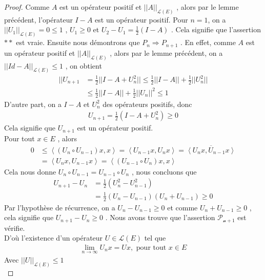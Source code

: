 \documentclass{report}
\begin{document}
{\begin{proof}
Comme $A$ est un opérateur positif et $||A||_{\mathscr{L}(E)}$ , alors par le lemme précédent, l'opérateur $I - A$ est un opérateur positif. Pour $n = 1$, on a $||U_1||_{\mathscr{L}(E)} = 0 \le 1$ , $U_1 \ge 0$ et $U_2 - U_1 = \frac{1}{2} (I - A)$ . Cela signifie que l'assertion $**$ est vraie. Ensuite nous démontrons que $P_n \Rightarrow P_{n+1}$ . En effet, comme $A$ est un opérateur positif et $||A||_{\mathscr{L}(E)}$ , alors par le lemme précédent, on a $||Id - A||_{\mathscr{L}(E)} \le 1$ , on obtient 
									\begin{align*}
					 ||U_{n+1} &= \frac{1}{2} ||I - A + U_n^2|| \le \frac{1}{2} ||I-A|| + \frac{1}{2} ||U_n^2|| \\
					 &\le \frac{1}{2} ||I-A|| + \frac{1}{2} ||U_n||^2 \le 1
									\end{align*}
D'autre part, on a $I - A$ et $U_n^2$ des opérateurs positifs, donc 
									\begin{align*}
					 U_{n+1} = \frac{1}{2} (I - A + U_n^2) \ge 0
									\end{align*}
Cela signifie que $U_{n+1}$ est un opérateur positif.\\
Pour tout $x \in E$ , alors 
									\begin{align*}
					 0 &\le \left< (U_n\circ U_{n-1})x,x \right> = \left< U_{n-1}x,U_nx \right> = \overline{\left< U_nx,U_{n-1}x \right>}  \\					 
					 &= \left< U_nx,U_{n-1}x \right> = \left< (U_{n-1}\circ U_n)x,x \right>
									\end{align*}
Cela nous donne $U_n \circ U_{n-1} = U_{n-1} \circ U_n$ , nous concluons que 
									\begin{align*}
					 U_{n+1} - U_n &= \frac{1}{2} (U_n^2 - U_{n-1}^2) \\
					 &= \frac{1}{2} (U_n - U_{n-1}) (U_n + U_{n-1}) \ge 0
									\end{align*}
Par l'hypothèse de récurrence, on a $U_n - U_{n-1} \ge 0$ et comme $U_n + U_{n-1} \ge 0$ , cela signifie que $U_{n+1} - U_n \ge 0$ . Nous avons trouve que l'assertion $\mathscr{P_{n+1}}$ est vérifie.\\
D'où l'existence d'un opérateur $U \in \mathscr{L}(E)$ tel que 
									\begin{align*}
					 \lim_{n\to \infty} U_n x = U x        , \,\,\text{pour tout}\,\, x \in E
									\end{align*}
Avec $||U||_{\mathscr{L}(E)} \le 1$ \\

\end{proof}



}
\end{document}
